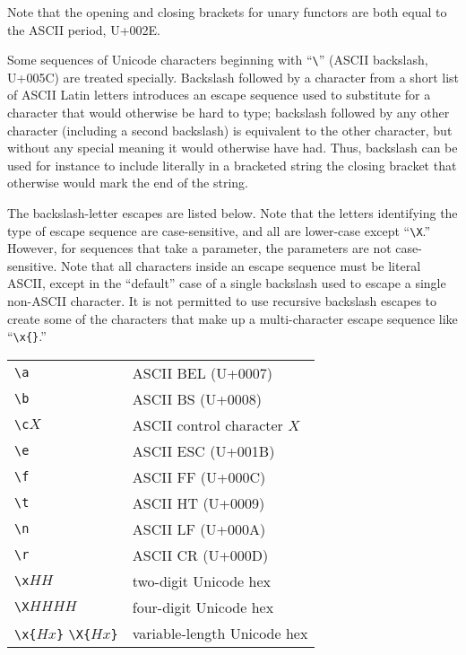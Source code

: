 \documentclass[twocolumn]{report}
\begin{document}
Note that the opening and closing brackets for unary functors are both equal
to the ASCII period, U+002E.

Some sequences of Unicode characters beginning with
``\texttt{\textbackslash}'' (ASCII backslash, U+005C) are treated specially. 
Backslash followed by a character from a short list of ASCII Latin letters
introduces an escape sequence used to substitute for a character that would
otherwise be hard to type; backslash followed by any other character
(including a second backslash) is equivalent to the other character, but
without any special meaning it would otherwise have had.  Thus, backslash
can be used for instance to include literally in a bracketed string the
closing bracket that otherwise would mark the end of the string.

The backslash-letter escapes are listed below.  Note that the letters
identifying the type of escape sequence are case-sensitive, and all are
lower-case except ``\texttt{\textbackslash X}.''  However, for sequences
that take a parameter, the parameters are not case-sensitive.  Note that all
characters inside an escape sequence must be literal ASCII, except in the
``default'' case of a single backslash used to escape a single non-ASCII
character.  It is not permitted to use recursive backslash escapes to create
some of the characters that make up a multi-character escape sequence like
``\texttt{\textbackslash x\{\}}.''

\hspace*{\fill}
\begin{tabular}{ll}
  \texttt{\textbackslash a} & ASCII BEL (U+0007) \\
  \texttt{\textbackslash b} & ASCII BS (U+0008) \\
  \texttt{\textbackslash c}$X$ & ASCII control character $X$ \\
  \texttt{\textbackslash e} & ASCII ESC (U+001B) \\
  \texttt{\textbackslash f} & ASCII FF (U+000C) \\
  \texttt{\textbackslash t} & ASCII HT (U+0009) \\
  \texttt{\textbackslash n} & ASCII LF (U+000A) \\
  \texttt{\textbackslash r} & ASCII CR (U+000D) \\
  \texttt{\textbackslash x}$HH$ & two-digit Unicode hex \\
  \texttt{\textbackslash X}$HHHH$ & four-digit Unicode hex \\
  \texttt{\textbackslash x\{}$Hx$\texttt{\}}
    \texttt{\textbackslash X\{}$Hx$\texttt{\}} &
    variable-length Unicode hex
\end{tabular}
\hspace*{\fill}\par
\end{document}
